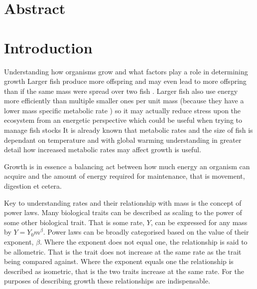 \documentclass[a4paper, hidelinks]{article} %
\begin{document}
	

	\section*{Abstract}
	\linenumbers

	
	
	\nolinenumbers
	
	
	\tableofcontents
	\newpage


\section{Introduction}
	\linenumbers
	Understanding how organisms grow and what factors play a role in determining growth
	Larger fish produce more offspring %
	and may even lead to more offspring than if the same mass were spread over two fish \parencite{Barneche2018}.
	Larger fish also use energy more efficiently than multiple smaller ones per unit mass (because they have a lower mass specific metabolic rate \parencite{Peters1983}) so it may actually reduce stress upon the ecosystem from an energetic perspective which could be useful when trying to manage fish stocks %
	It is already known that metabolic rates and the size of fish is dependant on temperature and with global warming understanding in greater detail how increased metabolic rates may affect growth is useful.
	
	
	Growth is in essence a balancing act between how much energy an organism can acquire and the amount of energy required for maintenance, that is movement, digestion et cetera.  
	
	Key to understanding rates and their relationship with mass is the concept of power laws. Many biological traits can be described as scaling to the power of some other biological trait.  That is some rate, $Y$, can be expressed for any mass by $Y = Y_0 m^\beta$.  Power laws can be broadly categorised based on the value of their exponent, $\beta$.  Where the exponent does not equal one, the relationship is said to be allometric.  That is the trait does not increase at the same rate as the trait being compared against.  Where the exponent equals one the relationship is described as isometric, that is the two traits increase at the same rate. For the purposes of describing growth these relationships are indispensable.   
	
\end{document}
